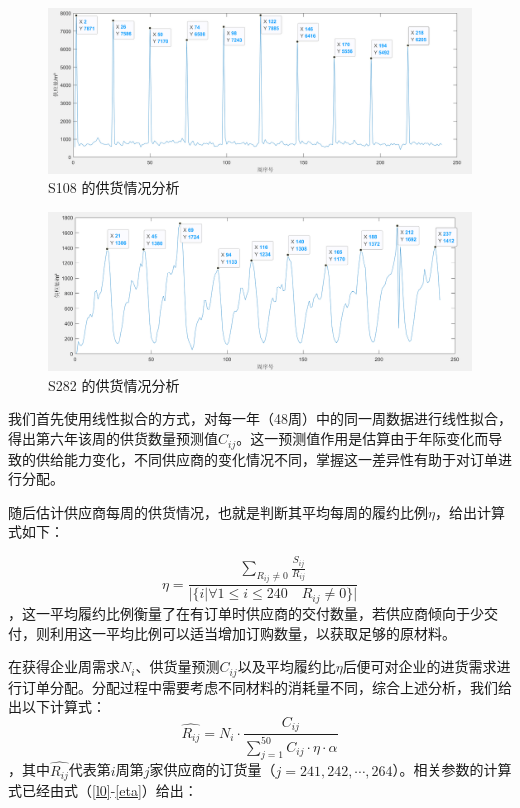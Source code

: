 \documentclass{my_paper}
\begin{document}
\begin {figure}[h]
\centering %
\includegraphics[width=\textwidth]{zhouqi.png}
\caption{S108 的供货情况分析} %
\label{zhouqi}
\end {figure}

\begin {figure}[h]
\centering %
\includegraphics[width=\textwidth]{zhouqi2.png}
\caption{S282 的供货情况分析} %
\label{zhouqi2}
\end {figure}
我们首先使用线性拟合的方式，对每一年（48周）中的同一周数据进行线性拟合，得出第六年该周的供货数量预测值$\hat{C}_{ij}$。这一预测值作用是估算由于年际变化而导致的供给能力变化，不同供应商的变化情况不同，掌握这一差异性有助于对订单进行分配。

随后估计供应商每周的供货情况，也就是判断其平均每周的履约比例$\eta$，给出计算式如下：

\begin{equation}
\eta = \frac{\sum\limits_{R_{ij}\neq 0} \frac{S_{ij}}{R_{ij}}}{|\{i|\forall 1\leq i\leq 240 \quad R_{ij}\neq 0 \}|}
\label{eta}
\end{equation}
，这一平均履约比例衡量了在有订单时供应商的交付数量，若供应商倾向于少交付，则利用这一平均比例可以适当增加订购数量，以获取足够的原材料。

在获得企业周需求$N_i$、供货量预测$C_{ij}$以及平均履约比$\eta$后便可对企业的进货需求进行订单分配。分配过程中需要考虑不同材料的消耗量不同，综合上述分析，我们给出以下计算式：
\begin{equation}
\hat{R_{ij}} = N_i\cdot \frac{C_{ij}}{\sum\limits^{50}_{j=1}C_{ij}\cdot \eta \cdot \alpha}
\label{rijr}
\end{equation}
，其中$\hat{R_{ij}}$代表第$i$周第$ j $家供应商的订货量（$j=241,242,\cdots,264$）。相关参数的计算式已经由式（\ref{l0}-\ref{eta}）给出：
\end{document}
